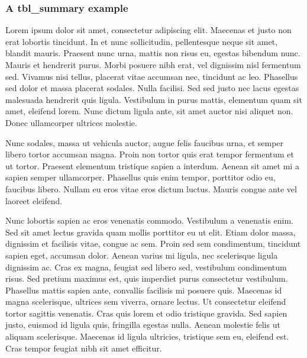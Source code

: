\documentclass[]{elsarticle} %
\begin{document}
\newpage

\hypertarget{a-tbl_summary-example}{%
\subsubsection{A tbl\_summary example}\label{a-tbl_summary-example}}

Lorem ipsum dolor sit amet, consectetur adipiscing elit. Maecenas et
justo non erat lobortis tincidunt. In et nunc sollicitudin, pellentesque
neque sit amet, blandit mauris. Praesent nunc urna, mattis non risus eu,
egestas bibendum nunc. Mauris et hendrerit purus. Morbi posuere nibh
erat, vel dignissim nisl fermentum sed. Vivamus nisi tellus, placerat
vitae accumsan nec, tincidunt ac leo. Phasellus sed dolor et massa
placerat sodales. Nulla facilisi. Sed sed justo nec lacus egestas
malesuada hendrerit quis ligula. Vestibulum in purus mattis, elementum
quam sit amet, eleifend lorem. Nunc dictum ligula ante, sit amet auctor
nisi aliquet non. Donec ullamcorper ultrices molestie.

Nunc sodales, massa ut vehicula auctor, augue felis faucibus urna, et
semper libero tortor accumsan magna. Proin non tortor quis erat tempor
fermentum et ut tortor. Praesent elementum tristique sapien a interdum.
Aenean sit amet mi a sapien semper ullamcorper. Phasellus quis enim
tempor, porttitor odio eu, faucibus libero. Nullam eu eros vitae eros
dictum luctus. Mauris congue ante vel laoreet eleifend.

Nunc lobortis sapien ac eros venenatis commodo. Vestibulum a venenatis
enim. Sed sit amet lectus gravida quam mollis porttitor eu ut elit.
Etiam dolor massa, dignissim et facilisis vitae, congue ac sem. Proin
sed sem condimentum, tincidunt sapien eget, accumsan dolor. Aenean
varius mi ligula, nec scelerisque ligula dignissim ac. Cras ex magna,
feugiat sed libero sed, vestibulum condimentum risus. Sed pretium
maximus est, quis imperdiet purus consectetur vestibulum. Phasellus
mattis sapien ante, convallis facilisis mi posuere quis. Maecenas id
magna scelerisque, ultrices sem viverra, ornare lectus. Ut consectetur
eleifend tortor sagittis venenatis. Cras quis lorem et odio tristique
gravida. Sed sapien justo, euismod id ligula quis, fringilla egestas
nulla. Aenean molestie felis ut aliquam scelerisque. Maecenas id ligula
ultricies, tristique sem eu, eleifend est. Cras tempor feugiat nibh sit
amet efficitur.

 
  \providecommand{\huxb}[2]{\arrayrulecolor[RGB]{#1}\global\arrayrulewidth=#2pt}
  \providecommand{\huxvb}[2]{\color[RGB]{#1}\vrule width #2pt}
  \providecommand{\huxtpad}[1]{\rule{0pt}{#1}}
  \providecommand{\huxbpad}[1]{\rule[-#1]{0pt}{#1}}
\end{document}

